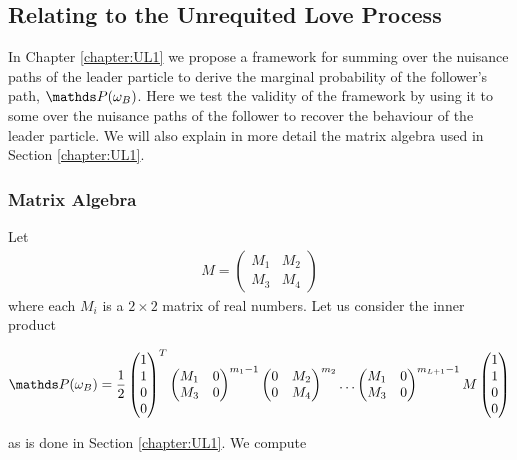 \subsection{Relating to the Unrequited Love Process}
\label{appendix:recovering}
In Chapter \ref{chapter:UL1} we propose a framework for summing over the nuisance paths of the leader particle to derive the marginal probability of the follower's path, $\bP(\omega_B)$.  Here we test the validity of the framework by using it to some over the nuisance paths of the follower to recover the behaviour of the leader particle. We will also explain in more detail the matrix algebra used in Section \ref{chapter:UL1}. 

\subsubsection{Matrix Algebra}
Let 
\begin{align}
M = \begin{pmatrix} M_1 & M_2 \\ M_3 & M_4\end{pmatrix}
\end{align}
where each $M_i$ is a $2 \times 2$ matrix of real numbers. Let us consider the inner product 

\begin{align}\label{inner-prod-sandwich}
\bP(\omega_B) = \frac{1}{2}\begin{pmatrix}1 \\ 1 \\ 0 \\ 0 \end{pmatrix}^T\begin{pmatrix} M_1 & 0 \\ M_3 & 0 \end{pmatrix}^{m_1-1}\begin{pmatrix} 0 & M_2 \\ 0 & M_4 \end{pmatrix}^{m_2}\ldots\begin{pmatrix} M_1 & 0 \\ M_3 & 0 \end{pmatrix}^{m_{L+1}-1}M\begin{pmatrix}1 \\ 1 \\ 0 \\ 0 \end{pmatrix}
\end{align}

as is done in Section \ref{chapter:UL1}. We compute 

